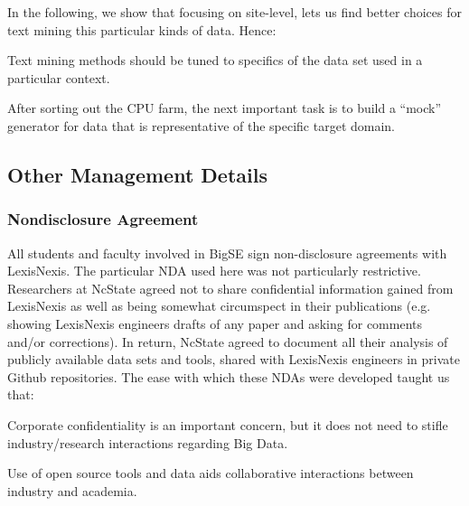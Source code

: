\documentclass{sig-alternate-05-2015}
\theoremstyle{break}
\begin{document}
In the following, we show that focusing on site-level,
lets us find better choices for text mining this particular
kinds of data. Hence:
\begin{lesson}
Text mining methods should be tuned to specifics
of the data set used in a particular context.
\end{lesson}  
\begin{lesson}
After sorting out the CPU farm, the next  important task is to
build a ``mock''   generator for data that is representative of the specific
target domain.
\end{lesson} 



\subsection{Other Management Details}

\subsubsection{Nondisclosure Agreement}

All students and faculty involved in BigSE
 sign non-disclosure agreements with LexisNexis. The particular NDA used
 here was not particularly restrictive. Researchers at NcState agreed not to share confidential
 information gained from LexisNexis as well as being somewhat circumspect in their publications
 (e.g. showing LexisNexis engineers drafts of any paper and asking for comments and/or
 corrections).  In return, NcState agreed to document all their analysis of   publicly
 available data sets and tools, shared with LexisNexis engineers in private Github repositories.  The ease
 with which these NDAs were developed taught us that:
 \begin{lesson}
Corporate confidentiality is an important
concern, but it does not need  to  stifle
industry/research interactions regarding Big Data.
\end{lesson} 
\begin{lesson}
Use of open source tools and data aids collaborative interactions
between industry and academia.
\end{lesson}
\end{document}
